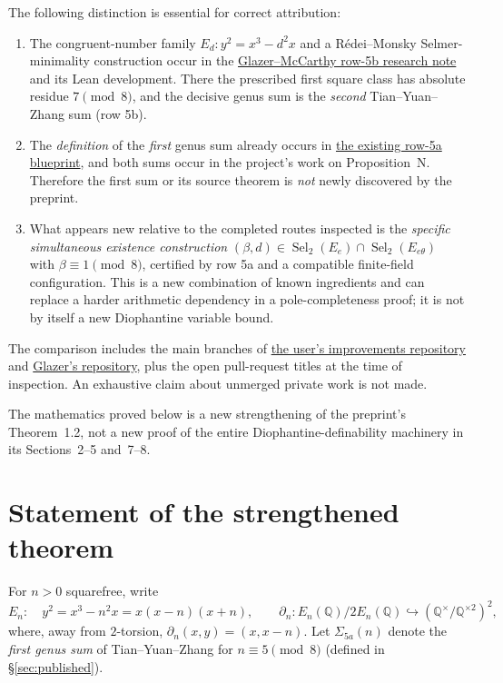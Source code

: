 \documentclass[11pt,a4paper]{article}
\theoremstyle{definition}
\newcommand{\QQ}{\mathbb Q}
\newcommand{\Sel}{\operatorname{Sel}_2}
\begin{document}
The following distinction is essential for correct attribution:
\begin{enumerate}[label=\textup{(\roman*)},itemsep=2pt]
\item The congruent-number family $E_d:y^2=x^3-d^2x$ and a
      R\'edei--Monsky Selmer-minimality construction occur in the
      \href{https://github.com/elliotglazer/diophantine-z-q/blob/main/docs/research/tyz-5b.md}{Glazer--McCarthy row-5b research note}
      and its Lean development.  There the prescribed first square class has
      absolute residue $7\pmod8$, and the decisive genus sum is the
      \emph{second} Tian--Yuan--Zhang sum (row 5b).
\item The \emph{definition} of the \emph{first} genus sum already occurs in
      \href{https://github.com/elliotglazer/diophantine-z-q/blob/main/blueprint/roadmap/rank/literature/genus-sum-5a.md}{the existing row-5a blueprint},
      and both sums occur in the project's work on Proposition~N.
      Therefore the first sum or its source theorem is \emph{not} newly
      discovered by the preprint.
\item What appears new relative to the completed routes inspected is the
      \emph{specific simultaneous existence construction}
      $(\beta,d)\in\Sel(E_e)\cap\Sel(E_{e\theta})$ with
      $\beta\equiv1\pmod8$, certified by row 5a and a compatible
      finite-field configuration.  This is a new combination of known
      ingredients and can replace a harder arithmetic dependency in a
      pole-completeness proof; it is not by itself a new Diophantine
      variable bound.
\end{enumerate}
The comparison includes the main branches of
\href{https://github.com/JoseBrox/diophantine-z-q_improvements}{the user's improvements repository}
and \href{https://github.com/elliotglazer/diophantine-z-q}{Glazer's repository},
plus the open pull-request titles at the time of inspection.  An exhaustive
claim about unmerged private work is not made.

The mathematics proved below is a new strengthening of the preprint's
Theorem~1.2, not a new proof of the entire Diophantine-definability
machinery in its Sections~2--5 and~7--8.

\section{Statement of the strengthened theorem}\label{sec:main}

For $n>0$ squarefree, write
\[
 E_n:\quad y^2=x^3-n^2x=x(x-n)(x+n),\qquad
 \partial_n:E_n(\QQ)/2E_n(\QQ)\hookrightarrow
       (\QQ^\times/\QQ^{\times2})^2,
\]
where, away from $2$-torsion, $\partial_n(x,y)=(x,x-n)$.
Let $\Sigma_{5a}(n)$ denote the \emph{first genus sum} of
Tian--Yuan--Zhang for $n\equiv5\pmod8$ (defined in
\S\ref{sec:published}).
\end{document}
